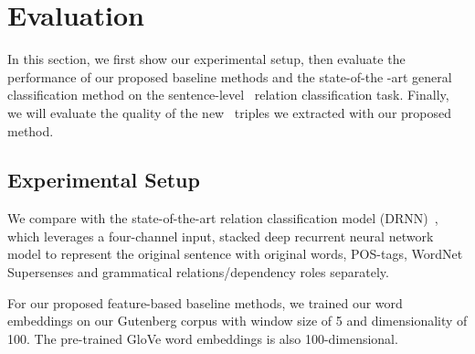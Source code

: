 \section {Evaluation}
\label{sec:eval}

In this section, we first show our experimental setup, then evaluate 
the performance of our proposed baseline methods and the state-of-the
-art general classification method on the 
sentence-level \lnear~relation classification task. 
Finally, we will evaluate the quality of the new \lnear~triples we extracted with our proposed method.

\subsection{Experimental Setup}
\label{sec:experiment}

We compare with the state-of-the-art relation classification model 
(DRNN)~\cite{xu2016improved}, which leverages
a four-channel input, stacked deep recurrent neural network model to represent the original sentence with original words, POS-tags, WordNet Supersenses and grammatical relations/dependency roles separately. 

For our proposed feature-based baseline methods, 
we trained our word embeddings on our Gutenberg corpus with window size of 5 and dimensionality of 100. 
The pre-trained GloVe word embeddings is also 100-dimensional.

%


